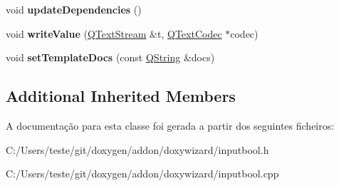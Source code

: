 \begin{DoxyCompactItemize}
\item 
\hypertarget{class_input_bool_a37cd3bc28aa6e7a7845bbaca9b007da2}{void {\bfseries update\-Dependencies} ()}\label{class_input_bool_a37cd3bc28aa6e7a7845bbaca9b007da2}

\item 
\hypertarget{class_input_bool_a9a9359fba2cb1dfbac6a19e36adbadf9}{void {\bfseries write\-Value} (\hyperlink{class_q_text_stream}{Q\-Text\-Stream} \&t, \hyperlink{class_q_text_codec}{Q\-Text\-Codec} $\ast$codec)}\label{class_input_bool_a9a9359fba2cb1dfbac6a19e36adbadf9}

\item 
\hypertarget{class_input_bool_a3736660c3a13fe78902eb7a843e7eb3f}{void {\bfseries set\-Template\-Docs} (const \hyperlink{class_q_string}{Q\-String} \&docs)}\label{class_input_bool_a3736660c3a13fe78902eb7a843e7eb3f}

\end{DoxyCompactItemize}
\subsection*{Additional Inherited Members}


A documentação para esta classe foi gerada a partir dos seguintes ficheiros\-:\begin{DoxyCompactItemize}
\item 
C\-:/\-Users/teste/git/doxygen/addon/doxywizard/inputbool.\-h\item 
C\-:/\-Users/teste/git/doxygen/addon/doxywizard/inputbool.\-cpp\end{DoxyCompactItemize}
